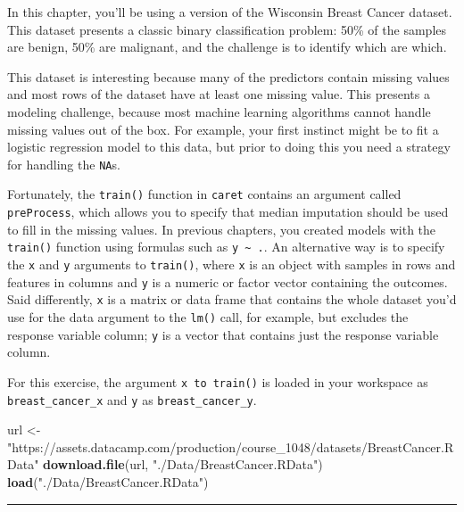 \documentclass[]{book}
\newenvironment{Shaded}{\begin{snugshade}}{\end{snugshade}}
\newcommand{\KeywordTok}[1]{\textcolor[rgb]{0.13,0.29,0.53}{\textbf{#1}}}
\newcommand{\StringTok}[1]{\textcolor[rgb]{0.31,0.60,0.02}{#1}}
\newcommand{\NormalTok}[1]{#1}
\begin{document}
In this chapter, you'll be using a version of the Wisconsin Breast
Cancer dataset. This dataset presents a classic binary classification
problem: 50\% of the samples are benign, 50\% are malignant, and the
challenge is to identify which are which.

This dataset is interesting because many of the predictors contain
missing values and most rows of the dataset have at least one missing
value. This presents a modeling challenge, because most machine learning
algorithms cannot handle missing values out of the box. For example,
your first instinct might be to fit a logistic regression model to this
data, but prior to doing this you need a strategy for handling the
\texttt{NA}s.

Fortunately, the \texttt{train()} function in \texttt{caret} contains an
argument called \texttt{preProcess}, which allows you to specify that
median imputation should be used to fill in the missing values. In
previous chapters, you created models with the \texttt{train()} function
using formulas such as \texttt{y\ \textasciitilde{}\ .}. An alternative
way is to specify the \texttt{x} and \texttt{y} arguments to
\texttt{train()}, where \texttt{x} is an object with samples in rows and
features in columns and \texttt{y} is a numeric or factor vector
containing the outcomes. Said differently, \texttt{x} is a matrix or
data frame that contains the whole dataset you'd use for the data
argument to the \texttt{lm()} call, for example, but excludes the
response variable column; \texttt{y} is a vector that contains just the
response variable column.

For this exercise, the argument \texttt{x\ to\ train()} is loaded in
your workspace as \texttt{breast\_cancer\_x} and \texttt{y} as
\texttt{breast\_cancer\_y}.

\begin{Shaded}
\begin{Highlighting}[]
\NormalTok{url <-}\StringTok{ "https://assets.datacamp.com/production/course_1048/datasets/BreastCancer.RData"}
\KeywordTok{download.file}\NormalTok{(url, }\StringTok{"./Data/BreastCancer.RData"}\NormalTok{)}
\KeywordTok{load}\NormalTok{(}\StringTok{"./Data/BreastCancer.RData"}\NormalTok{)}
\end{Highlighting}
\end{Shaded}

\begin{center}\rule{0.5\linewidth}{\linethickness}\end{center}
\end{document}
